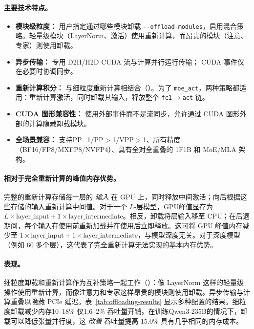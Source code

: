 \documentclass[10pt,logo,copyright]{nvidiatechreport_zh}
\begin{document}
\paragraph{主要技术特点。}
\begin{itemize}[itemsep=2pt,topsep=4pt]
    \item \textbf{模块级粒度：} 用户指定通过哪些模块卸载 \verb|--offload-modules|，启用混合策略。轻量级模块（LayerNorm、激活）使用重新计算，而昂贵的模块（注意、专家）则使用卸载。
    \item \textbf{异步传输：} 专用 D2H/H2D CUDA 流与计算并行运行传输； CUDA 事件仅在必要时协调同步。
    \item \textbf{重新计算积分：} 与细粒度重新计算相结合（）。为了 \texttt{moe\_act}，两种策略都适用：重新计算激活，同时卸载其输入，释放整个 \texttt{fc1}$\rightarrow$\texttt{act} 链。
    \item \textbf{CUDA 图形兼容性：} 使用外部事件而不是流同步，允许通过 CUDA 图形外部的计算隐藏卸载模块。
    \item \textbf{全场景兼容：} 支持PP=1/PP$>$1/VPP$>$1、所有精度（BF16/FP8/MXFP8/NVFP4）、具有全对全重叠的 1F1B 和 MoE/MLA 架构。
\end{itemize}

\paragraph{相对于完全重新计算的峰值内存优势。}
完整的重新计算存储每一层的 \textit{输入} 在 GPU 上，同时释放中间激活；向后根据这些存储的输入重新计算中间值。对于一个 $L$-层模型，GPU峰值显存为 $L \times \text{layer\_input} + 1 \times \text{layer\_intermediate}$。相反，卸载将层输入移至 CPU；在后退期间，每个输入在使用前重新加载并在使用后立即释放。这可将 GPU 峰值内存减少至 $1 \times \text{layer\_input} + 1 \times \text{layer\_intermediate}$，与模型深度无关。对于深度模型（例如 60 多个层），这代表了完全重新计算无法实现的基本内存优势。

\paragraph{表现。}
细粒度卸载和重新计算作为互补策略一起工作（）：像 LayerNorm 这样的轻量级操作使用重新计算，而像注意力和专家这样昂贵的模块则使用卸载。异步传输与计算重叠以隐藏 PCIe 延迟。表~\ref{tab:offloading-results} 显示多种配置的结果。细粒度卸载减少内存10--18\% 仅1.6--2\% 吞吐量开销。在训练Qwen3-235B的情况下，卸载可以降低张量并行度，这 \textit{改善} 吞吐量提高 15.0\% 具有几乎相同的内存成本。
\end{document}
